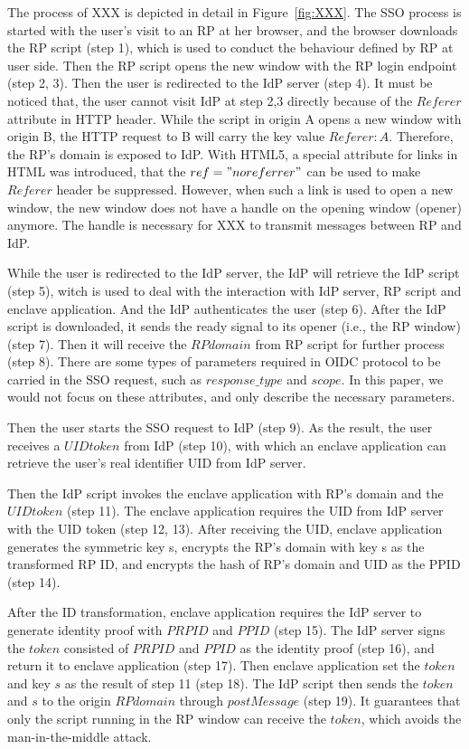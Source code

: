 The process of XXX is depicted in detail in Figure~\ref{fig:XXX}.
The SSO process is started with the user's visit to an RP at her browser, and the browser downloads the RP script (step 1), which is used to conduct the behaviour defined by RP at user side. Then the RP script opens the new window with the RP login endpoint (step 2, 3). Then the user is redirected to the IdP server (step 4). It must be noticed that, the user cannot visit IdP at step 2,3 directly because of the $Referer$ attribute in HTTP header. While the script in origin A opens a new window with origin B, the HTTP request to B will carry the key value $Referer: A$. Therefore, the RP's domain is exposed to IdP. With HTML5, a special attribute for links in HTML was introduced, that the $ref="noreferrer"$ can be used to make $Referer$ header be suppressed. However, when such a link is used to open a new window, the new window does not have a handle on the opening window (opener) anymore. The handle is necessary for XXX to transmit messages between RP and IdP.



While the user is redirected to the IdP server, the IdP will retrieve the IdP script (step 5), witch is used to deal with the interaction with IdP server, RP script and enclave application.
And the IdP authenticates the user (step 6). After the IdP script is downloaded, it sends the ready signal to its opener (i.e., the RP window) (step 7). Then it will receive the $RPdomain$ from RP script for further process (step 8). There are some types of parameters required in OIDC protocol to be carried in the SSO request, such as $response\_type$ and $scope$. In this paper, we would not focus on these attributes, and only describe the necessary parameters. 

Then the user starts the SSO request to IdP (step 9). As the result, the user receives a $UID token$ from IdP (step 10), with which an enclave application can retrieve the user's real identifier UID from IdP server.

Then the IdP script invokes the enclave application with RP's domain and the $UID token$ (step 11). The enclave application requires the UID from IdP server with the UID token (step 12, 13). After receiving the UID, enclave application generates the symmetric key s, encrypts the RP's domain with key s as the transformed RP ID, and encrypts the hash of RP's domain and UID as the PPID (step 14). 

After the ID transformation, enclave application requires the IdP server to generate identity proof with $PRPID$ and $PPID$ (step 15). The IdP server signs the $token$ consisted of $PRPID$ and $PPID$ as the identity proof (step 16), and return it to enclave application (step 17). Then enclave application set the $token$ and key $s$ as the result of step 11 (step 18). The IdP script then sends the $token$ and $s$ to the origin $RPdomain$ through $postMessage$ (step 19). It guarantees that only the script running in the RP window can receive the $token$, which avoids the man-in-the-middle attack.

